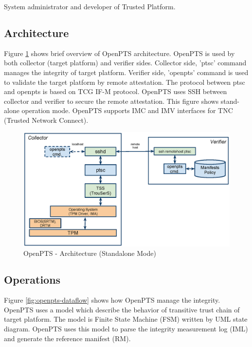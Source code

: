 \documentclass[10pt,a4paper]{article}
\begin{document}
System administrator and developer of Trusted Platform.

\subsection{Architecture}

Figure \ref{fig:openpts-architecture} shows brief overview of OpenPTS architecture.
OpenPTS is used by both collector (target platform) and verifier sides.
Collector side, 'ptsc' command manages the integrity of target platform.
Verifier side, 'openpts' command is used to validate the target platform by remote attestation.
The protocol between ptsc and openpts is based on TCG IF-M protocol.
OpenPTS uses SSH between collector and verifier to secure the remote attestation.
This figure shows stand-alone operation mode.
OpenPTS supports IMC and IMV interfaces for TNC (Trusted Network Connect).

\begin{figure}[hb!p]
  \begin{center}
    \includegraphics[width=15cm]{OpenPTS-fig-architecture.eps}
  \end{center}
  \caption{OpenPTS - Architecture (Standalone Mode)}
  \label{fig:openpts-architecture}
\end{figure}



\clearpage
\subsection{Operations}

Figure \ref{fig:openpts-dataflow} shows how OpenPTS manage the integrity.
OpenPTS uses a model which describe the behavior of transitive trust chain of target platform.
The model is Finite State Machine (FSM) written by UML state diagram.
OpenPTS uses this model to parse the integrity measurement log (IML)
and generate the reference manifest (RM).
\end{document}
